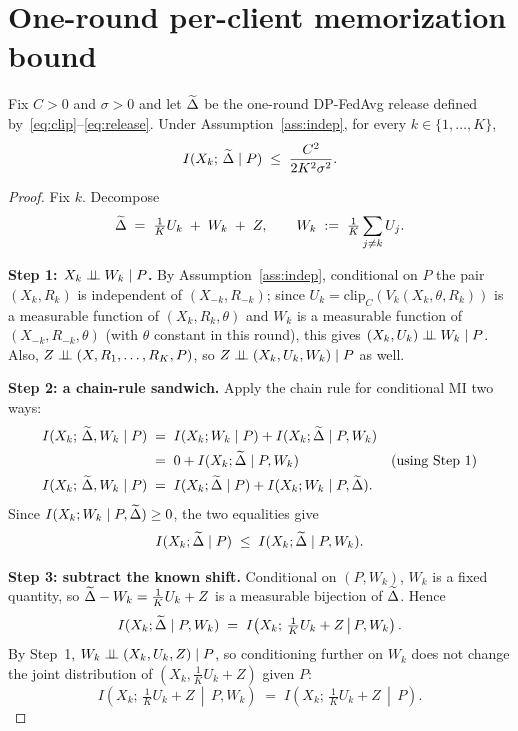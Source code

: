 \section{One-round per-client memorization bound}\label{sec:one-round}

\begin{theorem}\label{thm:one-round}
Fix \(C>0\) and \(\sigma>0\) and let \(\widetilde{\Delta}\) be the one-round DP-FedAvg release defined by~\eqref{eq:clip}--\eqref{eq:release}. Under Assumption~\ref{ass:indep}, for every \(k\in\{1,\dots,K\}\),
\begin{equation}\label{eq:one-round}
I(X_k;\,\widetilde{\Delta} \mid P) \;\le\; \frac{C^2}{2 K^2 \sigma^2}.
\end{equation}
\end{theorem}

\begin{proof}
Fix \(k\). Decompose
\[
\widetilde{\Delta} \;=\; \tfrac{1}{K}U_k \;+\; W_k \;+\; Z, \qquad W_k \;:=\; \tfrac{1}{K}\sum_{j\ne k}U_j.
\]

\textbf{Step 1: \(X_k\perp\!\!\!\perp W_k\mid P\).}
By Assumption~\ref{ass:indep}, conditional on \(P\) the pair \((X_k,R_k)\) is independent of \((X_{-k},R_{-k})\); since \(U_k=\mathrm{clip}_C(V_k(X_k,\theta,R_k))\) is a measurable function of \((X_k,R_k,\theta)\) and \(W_k\) is a measurable function of \((X_{-k},R_{-k},\theta)\) (with \(\theta\) constant in this round), this gives \((X_k,U_k)\perp\!\!\!\perp W_k\mid P\). Also, \(Z\perp\!\!\!\perp(X,R_1,\dots,R_K,P)\), so \(Z\perp\!\!\!\perp(X_k,U_k,W_k)\mid P\) as well.

\textbf{Step 2: a chain-rule sandwich.}
Apply the chain rule for conditional MI two ways:
\begin{align*}
I(X_k;\,\widetilde{\Delta},W_k\mid P)
&\;=\;I(X_k;W_k\mid P)+I(X_k;\widetilde{\Delta}\mid P,W_k)\\
&\;=\;0+I(X_k;\widetilde{\Delta}\mid P,W_k)
&\text{(using Step 1)}\\
I(X_k;\,\widetilde{\Delta},W_k\mid P)
&\;=\;I(X_k;\widetilde{\Delta}\mid P)+I(X_k;W_k\mid P,\widetilde{\Delta}).
\end{align*}
Since \(I(X_k;W_k\mid P,\widetilde{\Delta})\ge 0\), the two equalities give
\begin{equation}\label{eq:remove-W}
I(X_k;\widetilde{\Delta}\mid P) \;\le\; I(X_k;\widetilde{\Delta}\mid P,W_k).
\end{equation}

\textbf{Step 3: subtract the known shift.}
Conditional on \((P,W_k)\), \(W_k\) is a fixed quantity, so \(\widetilde{\Delta} - W_k = \tfrac{1}{K}U_k+Z\) is a measurable bijection of \(\widetilde{\Delta}\). Hence
\begin{equation}\label{eq:bijection-step}
I(X_k;\widetilde{\Delta}\mid P,W_k) \;=\; I\!\left(X_k;\,\tfrac{1}{K}U_k+Z\,\middle|\,P,W_k\right).
\end{equation}
By Step~1, \(W_k\perp\!\!\!\perp(X_k,U_k,Z)\mid P\), so conditioning further on \(W_k\) does not change the joint distribution of \((X_k,\tfrac{1}{K}U_k+Z)\) given \(P\):
\begin{equation}\label{eq:condition-out-W}
I\!\left(X_k;\,\tfrac{1}{K}U_k+Z\,\middle|\,P,W_k\right) \;=\; I\!\left(X_k;\,\tfrac{1}{K}U_k+Z\,\middle|\,P\right).
\end{equation}


\end{proof}
